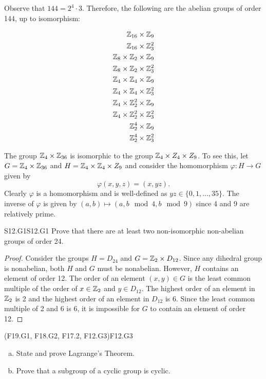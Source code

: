 \documentclass[../AlgebraQualSolutions.tex]{subfiles}
\begin{document}
\begin{solution}
Observe that $144 = 2^4 \cdot 3$. Therefore, the following are the abelian groups of order 144, up to isomorphism:

\begin{align*}
	\mathbb{Z}_{16} \times \mathbb{Z}_9 \\
	\mathbb{Z}_{16} \times \mathbb{Z}_3^2 \\
	\mathbb{Z}_8 \times \mathbb{Z}_2 \times \mathbb{Z}_9 \\
	\mathbb{Z}_8 \times \mathbb{Z}_2 \times \mathbb{Z}_3^2\\
	\mathbb{Z}_4 \times \mathbb{Z}_4 \times \mathbb{Z}_9 \\
	\mathbb{Z}_4 \times \mathbb{Z}_4 \times \mathbb{Z}_3^2\\
	\mathbb{Z}_4 \times \mathbb{Z}_2^2 \times \mathbb{Z}_9 \\
	\mathbb{Z}_4 \times \mathbb{Z}_2^2 \times \mathbb{Z}_3^2 \\
	\mathbb{Z}_2^4 \times \mathbb{Z}_9 \\
	\mathbb{Z}_2^4 \times \mathbb{Z}_3^2 \\
\end{align*}

The group $\mathbb{Z}_4 \times \mathbb{Z}_{36}$ is isomorphic to the group $\mathbb{Z}_4 \times Z_4 \times Z_9$. To see this, let $G = \mathbb{Z}_4 \times \mathbb{Z}_{36}$ and $H = \mathbb{Z}_4 \times \mathbb{Z}_{4} \times Z_9$ and consider the homomorphism $\varphi: H \to G$ given by
	\[\varphi(x,y,z) = (x,yz). \]
Clearly $\varphi$ is a homomorphism and is well-defined as $yz \in \{0,1, \ldots, 35\}$. The inverse of $\varphi$ is given by $(a,b) \mapsto(a,b\mod{4},b\mod{9})$ since 4 and 9 are relatively prime.
\end{solution}

\begin{prob}{S12.G1}{S12.G1}
	Prove that there are at least two non-isomorphic non-abelian groups of order 24.
\end{prob}

\begin{proof}
	Consider the groups $H = D_{24}$ and $G = \mathbb{Z}_2 \times D_{12}$. Since any dihedral group is nonabelian, both $H$ and $G$ must be nonabelian. However, $H$ contains an element of order 12. The order of an element $(x,y) \in G$ is the least common multiple of the order of $x \in \mathbb{Z}_2$ and $y \in D_{12}$. The highest order of an element in $\mathbb{Z}_2$ is 2 and the highest order of an element in $D_{12}$ is 6. Since the least common multiple of 2 and 6 is 6, it is impossible for $G$ to contain an element of order 12.
\end{proof}

	\begin{prob}{(F19.G1, F18.G2, F17.2, F12.G3)}{F12.G3}
	\begin{enumerate}[(a)]
	\item State and prove Lagrange's Theorem.
	\item Prove that a subgroup of a cyclic group is cyclic.
	\end{enumerate}
	\end{prob}
	
\end{document}
